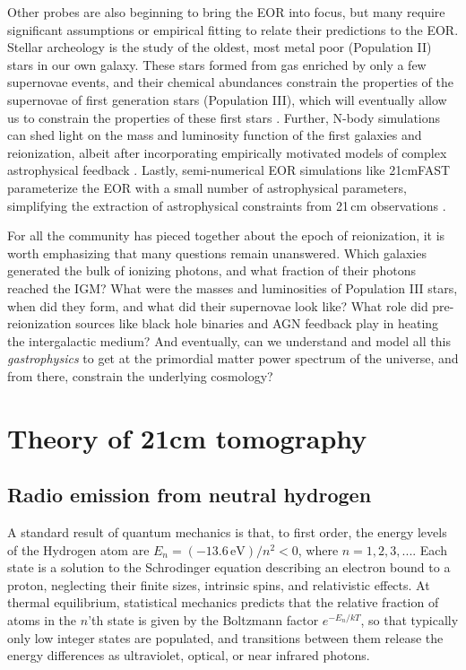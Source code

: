 {Other probes are also beginning to bring the EOR into focus, but many require significant assumptions or empirical fitting to relate their predictions to the EOR. Stellar archeology is the study of the oldest, most metal poor (Population II) stars in our own galaxy. These stars formed from gas enriched by only a few supernovae events, and their chemical abundances constrain the properties of the supernovae of first generation stars (Population III), which will eventually allow us to constrain the properties of these first stars \citep{Frebel2015}. Further, N-body simulations can shed light on the mass and luminosity function of the first galaxies and reionization, albeit after incorporating empirically motivated models of complex astrophysical feedback \citep{Bauer2015,Vogelsberger2014} . Lastly, semi-numerical EOR simulations like 21cmFAST \citep{21cmfast} parameterize the EOR with a small number of astrophysical parameters, simplifying the extraction of astrophysical constraints from 21\,cm observations \citep{PoberNextGen,PoberPAPER64Heating}. 

For all the community has pieced together about the epoch of reionization, it is worth emphasizing that many questions remain unanswered. Which galaxies generated the bulk of ionizing photons, and what fraction of their photons reached the IGM? What were the masses and luminosities of Population III stars, when did they form, and what did their supernovae look like? What role did pre-reionization sources like black hole binaries and AGN feedback play in heating the intergalactic medium? And eventually, can we understand and model all this \textit{gastrophysics} to get at the primordial matter power spectrum of the universe, and from there, constrain the underlying cosmology?

\section{Theory of 21cm tomography}
\label{sec:intro21cmsection}

\subsection{Radio emission from neutral hydrogen}

A standard result of quantum mechanics \citep[e.g.,][]{griffithsqm} is that, to first order, the energy levels of the Hydrogen atom are $E_n=(-13.6\,\text{eV})/n^2<0$, where $n=1,2,3,...$. Each state is a solution to the Schrodinger equation describing an electron bound to a proton, neglecting their finite sizes, intrinsic spins, and relativistic effects. At thermal equilibrium, statistical mechanics predicts that the relative fraction of atoms in the $n$'th state is given by the Boltzmann factor $e^{-E_n/kT}$, so that typically only low integer states are populated, and transitions between them release the energy differences as ultraviolet, optical, or near infrared photons. 

}
